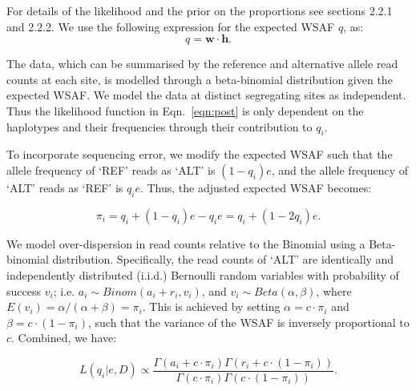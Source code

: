 \documentclass[9pt]{article}
\begin{document}
\noindent For details of the likelihood and the prior on the proportions see \citet{Zhu2017} sections 2.2.1 and 2.2.2. We use the following expression for the expected WSAF $q$, as:
\begin{equation}
q = \mathbf{w}\cdot\mathbf{h}.\label{eqn:qij_full_sum}
\end{equation}



\noindent The data, which can be summarised by the reference and alternative allele read counts at each site, is modelled through a beta-binomial distribution given the expected WSAF.  We model the data at distinct segregating sites as independent.  Thus the likelihood function  in Eqn.~\eqref{eqn:post} is only dependent on the haplotypes  and their frequencies through their contribution to $q_{i}$.


To incorporate sequencing error, we modify the expected WSAF such that the allele frequency of `REF' reads as `ALT' is $(1 - q_i)e$, and the allele frequency of `ALT' reads as `REF' is $q_ie$. Thus, the adjusted expected WSAF becomes:

\begin{equation}
\pi_i = q_i + (1 - q_i)e - q_ie = q_i + (1 - 2q_i)e.\label{eqn:adj_q}
\end{equation}

\noindent We model over-dispersion in read counts relative to the Binomial using a Beta-binomial distribution. Specifically, the read counts of `ALT' are identically and independently distributed (i.i.d.) Bernoulli random variables with probability of success $v_i$; i.e. $a_i \sim Binom(a_i + r_i, v_i)$, and $v_i \sim Beta(\alpha, \beta)$, where $E(v_i) = \alpha/(\alpha+\beta) = \pi_{i}$. This is achieved by setting $\alpha = c\cdot \pi_{i} $ and $\beta = c\cdot (1-\pi_{i})$, such that the variance of the WSAF is inversely proportional to $c$.  Combined, we have:

\begin{equation}
L(q_{i}| e, D) \propto \frac{\Gamma(a_i + c\cdot \pi_{i}) \Gamma(r_i + c\cdot (1-\pi_{i}))}{\Gamma(c\cdot \pi_{i})\Gamma(c\cdot (1-\pi_{i}))}. \label{eqn:llk}
\end{equation}


\end{document}
